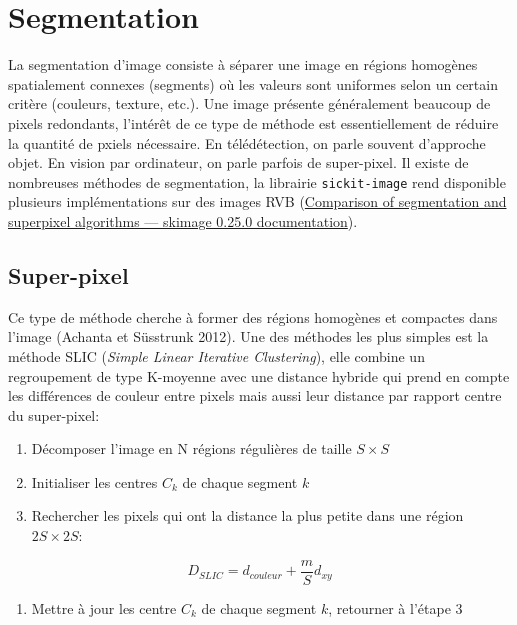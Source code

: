 \documentclass[
  11pt,
  letterpaper,
  open=any,
  twoside=false,
  french]{scrbook}
\providecommand{\tightlist}{%
  \setlength{\itemsep}{0pt}\setlength{\parskip}{0pt}}\usepackage{longtable,booktabs,array}
\begin{document}
\section{Segmentation}\label{segmentation}

La segmentation d'image consiste à séparer une image en régions
homogènes spatialement connexes (segments) où les valeurs sont uniformes
selon un certain critère (couleurs, texture, etc.). Une image présente
généralement beaucoup de pixels redondants, l'intérêt de ce type de
méthode est essentiellement de réduire la quantité de pxiels nécessaire.
En télédétection, on parle souvent d'approche objet. En vision par
ordinateur, on parle parfois de super-pixel. Il existe de nombreuses
méthodes de segmentation, la librairie \texttt{sickit-image} rend
disponible plusieurs implémentations sur des images RVB
(\href{https://scikit-image.org/docs/stable/auto_examples/segmentation/plot_segmentations.html\#sphx-glr-auto-examples-segmentation-plot-segmentations-py}{Comparison
of segmentation and superpixel algorithms --- skimage 0.25.0
documentation}).

\subsection{Super-pixel}\label{super-pixel}

Ce type de méthode cherche à former des régions homogènes et compactes
dans l'image (Achanta et Süsstrunk 2012). Une des méthodes les plus
simples est la méthode SLIC (\emph{Simple Linear Iterative Clustering}),
elle combine un regroupement de type K-moyenne avec une distance hybride
qui prend en compte les différences de couleur entre pixels mais aussi
leur distance par rapport centre du super-pixel:

\begin{enumerate}
\def\labelenumi{\arabic{enumi}.}
\item
  Décomposer l'image en N régions régulières de taille \(S \times S\)
\item
  Initialiser les centres \(C_k\) de chaque segment \(k\)
\item
  Rechercher les pixels qui ont la distance la plus petite dans une
  région \(2S \times 2S\):
\end{enumerate}

\[
D_{SLIC}= d_{couleur} + \frac{m}{S}d_{xy}
\]

\begin{enumerate}
\def\labelenumi{\arabic{enumi}.}
\setcounter{enumi}{2}
\tightlist
\item
  Mettre à jour les centre \(C_k\) de chaque segment \(k\), retourner à
  l'étape 3
\end{enumerate}
\end{document}
